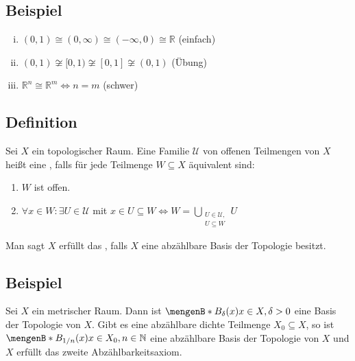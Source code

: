 \subsection[Beispiele für homöomorphe topologische Räume]{Beispiel} %
\label{sub:113}
\begin{enumerate}[(i)]
	\item $(0,1) \cong (0,\infty) \cong (-\infty,0) \cong \mathds{R}$ \hfill (einfach)
	\item $(0,1)\not\cong [0,1) \not\cong [0,1] \not\cong (0,1)$ \hfill (Übung)
	\item $\mathds{R}^n \cong \mathds{R}^m \iff n=m$ \hfill (schwer)
\end{enumerate}

\subsection[Definition: Basis der Topologie]{Definition} %
\label{sub:114}
Sei $X$ ein topologischer Raum. Eine Familie  $\mathcal{U}$ von offenen Teilmengen von $X$ heißt eine , falls für jede Teilmenge $W \subseteq X$
äquivalent sind:
\begin{enumerate}[(1)]
	\item $W$ ist offen.
	\item $\forall x \in W  : \exists U \in \mathcal{U}$ mit $x \in U \subseteq  W \iff W = \bigcup_{\substack{U \in \mathcal{U}, \\ U \subseteq W}} U$ 
\end{enumerate}
Man sagt $X$ erfüllt das , falls $X$ eine abzählbare Basis der Topologie besitzt.

\subsection[Beispiel: Basis der Topologie eines metrischen Raumes]{Beispiel} %
\label{sub:115}
Sei $X$ ein metrischer Raum. Dann ist $\set[B_\delta (x)]{x \in X, \delta > 0} $ eine Basis der Topologie von $X$. Gibt es eine abzählbare dichte Teilmenge $X_0\subseteq X$,
so ist $\set[B_{1/n}(x)]{x \in X_0, n \in \mathds{N}} $ eine abzählbare Basis der Topologie von $X$ und $X$ erfüllt das zweite Abzählbarkeitsaxiom.

